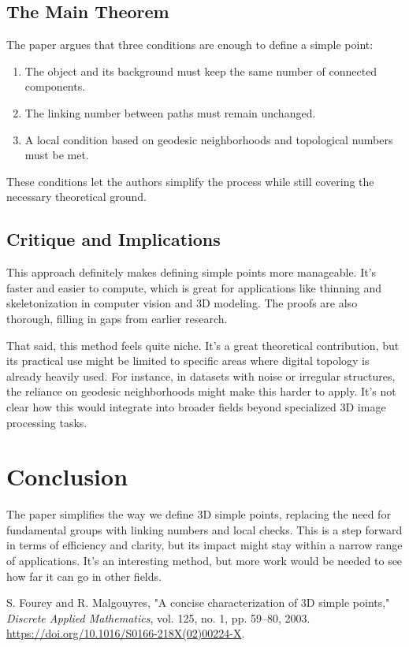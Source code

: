 \documentclass{llncs}
\begin{document}
\subsection{The Main Theorem}
The paper argues that three conditions are enough to define a simple point:
\begin{enumerate}
    \item The object and its background must keep the same number of connected components.
    \item The linking number between paths must remain unchanged.
    \item A local condition based on geodesic neighborhoods and topological numbers must be met.
\end{enumerate}
These conditions let the authors simplify the process while still covering the necessary theoretical ground.

\subsection{Critique and Implications}
This approach definitely makes defining simple points more manageable. It’s faster and easier to compute, which is great for applications like thinning and skeletonization in computer vision and 3D modeling. The proofs are also thorough, filling in gaps from earlier research.

That said, this method feels quite niche. It’s a great theoretical contribution, but its practical use might be limited to specific areas where digital topology is already heavily used. For instance, in datasets with noise or irregular structures, the reliance on geodesic neighborhoods might make this harder to apply. It’s not clear how this would integrate into broader fields beyond specialized 3D image processing tasks.

\section{Conclusion}
The paper simplifies the way we define 3D simple points, replacing the need for fundamental groups with linking numbers and local checks. This is a step forward in terms of efficiency and clarity, but its impact might stay within a narrow range of applications. It’s an interesting method, but more work would be needed to see how far it can go in other fields.

\begin{thebibliography}{1}

S. Fourey and R. Malgouyres, 
"A concise characterization of 3D simple points," 
\textit{Discrete Applied Mathematics}, 
vol. 125, no. 1, pp. 59–80, 2003. 
\url{https://doi.org/10.1016/S0166-218X(02)00224-X}.

\end{thebibliography}
\end{document}
